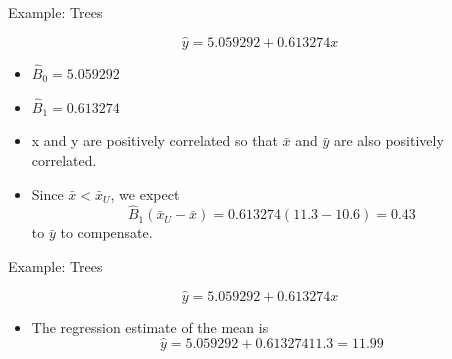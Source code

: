 \documentclass[10pt]{beamer}\usepackage[]{graphicx}\usepackage[]{xcolor}
\begin{document}
\begin{frame}[containsverbatim]{Example: Trees}
\begin{block}{}
$$\hat{y}= 5.059292+0.613274x$$
\end{block}

\begin{itemize}
\item $\hat{B}_0 = 5.059292$
\item $\hat{B}_1 = 0.613274$
\item x and y are positively correlated so that $\bar{x}$ and $\bar{y}$ are also positively correlated.
\item Since $\bar{x}<\bar{x}_U$, we expect $$\hat{B}_1(\bar{x}_U-\bar{x}) = 0.613274(11.3-10.6) =0.43$$
to $\bar{y}$ to compensate.
\end{itemize}


\end{frame}

\begin{frame}[containsverbatim]{Example: Trees}
\begin{block}{}
$$\hat{y}= 5.059292+0.613274x$$
\end{block}

\begin{itemize}
\item The regression estimate of the mean is
$$\hat{y}= 5.059292+0.613274 11.3 = 11.99$$
\end{itemize}


\end{frame}
\end{document}
